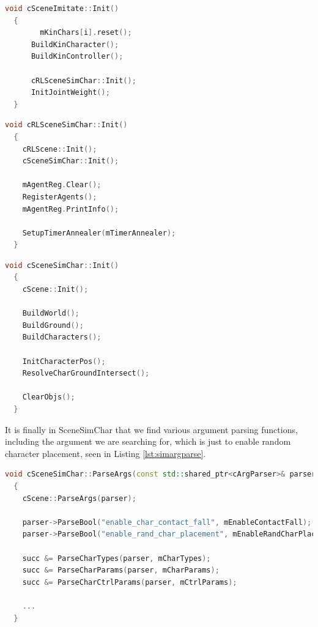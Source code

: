 \documentclass{l4proj}
\begin{document}
\begin{lstlisting}[language=C++, float, caption={The Function that initialises Scene Imitate}, label=lst:imitateinit]
  void cSceneImitate::Init()
  {
		mKinChars[i].reset();
	  BuildKinCharacter();
	  BuildKinController();

	  cRLSceneSimChar::Init();
	  InitJointWeight();
  }
\end{lstlisting}

\begin{lstlisting}[language=C++, float, caption={The function that initialises RLSceneSimChar}, label=lst:rlsiminit]
  void cRLSceneSimChar::Init()
  {
    cRLScene::Init();
    cSceneSimChar::Init();

    mAgentReg.Clear();
    RegisterAgents();
    mAgentReg.PrintInfo();

    SetupTimerAnnealer(mTimerAnnealer);
  }
\end{lstlisting}

\begin{lstlisting}[language=C++, float, caption={The function that initialises SceneSimChar}, label=lst:siminit]
  void cSceneSimChar::Init()
  {
    cScene::Init();

    BuildWorld();
    BuildGround();
    BuildCharacters();

    InitCharacterPos();
    ResolveCharGroundIntersect();

    ClearObjs();
  }
\end{lstlisting}

It is finally in SceneSimChar that we find various argument parsing functions, including the argument we are searching for, which is just to enable random character placement, seen in Listing \ref{lst:simargparse}.

\begin{lstlisting}[language=C++, float, caption={The function that parses the arguments for SceneSimChar}, label=lst:simargparse]
  void cSceneSimChar::ParseArgs(const std::shared_ptr<cArgParser>& parser)
  {
    cScene::ParseArgs(parser);

    parser->ParseBool("enable_char_contact_fall", mEnableContactFall);
    parser->ParseBool("enable_rand_char_placement", mEnableRandCharPlacement);
    
    succ &= ParseCharTypes(parser, mCharTypes);
    succ &= ParseCharParams(parser, mCharParams);
    succ &= ParseCharCtrlParams(parser, mCtrlParams);

    ...
  }
\end{lstlisting}
\end{document}

